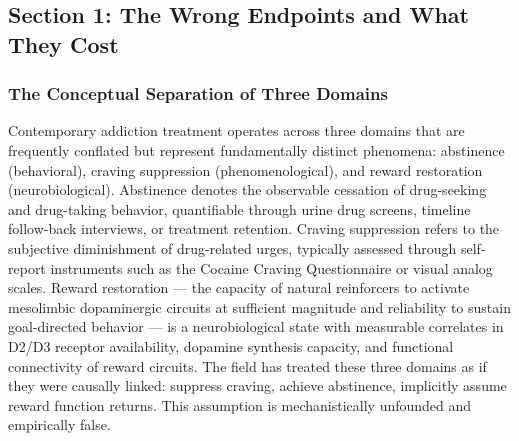 \subsection{}\label{18_restoration-section-2}

\subsection{}\label{18_restoration-section-3}

\subsection{}\label{18_restoration-section-4}

\subsection{Section 1: The Wrong Endpoints and What They Cost}\label{18_restoration-section-1-the-wrong-endpoints-and-what-they-cost}

\subsubsection{The Conceptual Separation of Three Domains}\label{18_restoration-the-conceptual-separation-of-three-domains}

Contemporary addiction treatment operates across three domains that are frequently conflated but represent fundamentally distinct phenomena: abstinence (behavioral), craving suppression (phenomenological), and reward restoration (neurobiological). Abstinence denotes the observable cessation of drug-seeking and drug-taking behavior, quantifiable through urine drug screens, timeline follow-back interviews, or treatment retention. Craving suppression refers to the subjective diminishment of drug-related urges, typically assessed through self-report instruments such as the Cocaine Craving Questionnaire or visual analog scales. Reward restoration --- the capacity of natural reinforcers to activate mesolimbic dopaminergic circuits at sufficient magnitude and reliability to sustain goal-directed behavior --- is a neurobiological state with measurable correlates in D2/D3 receptor availability, dopamine synthesis capacity, and functional connectivity of reward circuits. The field has treated these three domains as if they were causally linked: suppress craving, achieve abstinence, implicitly assume reward function returns. This assumption is mechanistically unfounded and empirically false.

